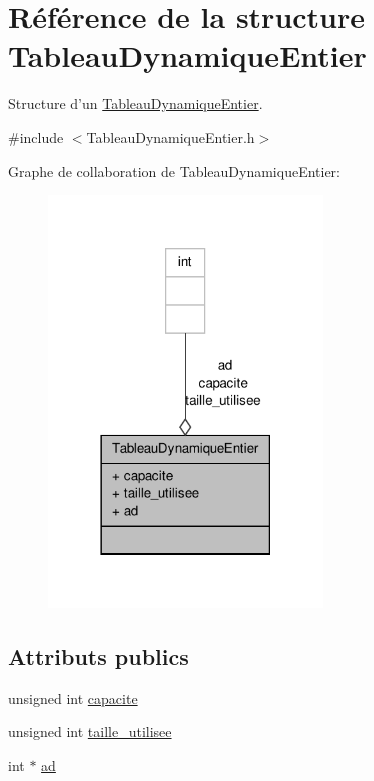 \hypertarget{structTableauDynamiqueEntier}{\section{Référence de la structure Tableau\-Dynamique\-Entier}
\label{structTableauDynamiqueEntier}
}


Structure d'un \hyperlink{structTableauDynamiqueEntier}{Tableau\-Dynamique\-Entier}.  




{\ttfamily \#include $<$Tableau\-Dynamique\-Entier.\-h$>$}



Graphe de collaboration de Tableau\-Dynamique\-Entier\-:
\nopagebreak
\begin{figure}[H]
\begin{center}
\leavevmode
\includegraphics[width=206pt]{structTableauDynamiqueEntier__coll__graph}
\end{center}
\end{figure}
\subsection*{Attributs publics}
\begin{DoxyCompactItemize}
\item 
unsigned int \hyperlink{structTableauDynamiqueEntier_a1fbdd8e4a11ba95e5a802fe9bb6cc2ff}{capacite}
\item 
unsigned int \hyperlink{structTableauDynamiqueEntier_ac7a23b3a002b4ce72556a1d5cebd3025}{taille\-\_\-utilisee}
\item 
int $\ast$ \hyperlink{structTableauDynamiqueEntier_a2ebf85c435f6e7db67050c4fbcaf62a9}{ad}
\end{DoxyCompactItemize}


